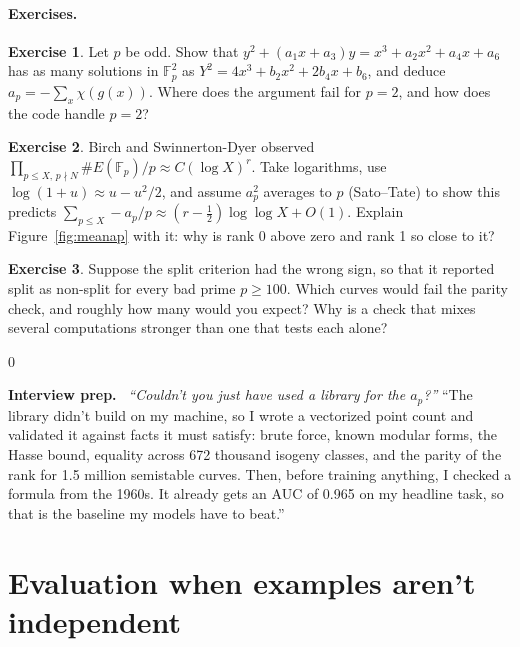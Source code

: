 \documentclass[11pt]{article}
\theoremstyle{definition}
\newtheorem{exercise}{Exercise}[section]
\theoremstyle{plain}
\theoremstyle{remark}
\newcommand{\F}{\mathbb{F}}
\renewcommand{\_}{\oldunderscore\allowbreak}
\newenvironment{interview}
  {\par\medskip\noindent\begin{lrbox}{0}\begin{minipage}{\dimexpr\linewidth-2\fboxsep-2\fboxrule\relax}
   \textbf{Interview prep.}\ }
  {\end{minipage}\end{lrbox}\fcolorbox{blue!40!black}{interviewbg}{\usebox{0}}\par\medskip}
\begin{document}
\paragraph{Exercises.}
\begin{exercise}\label{ex:count}
Let $p$ be odd. Show that $y^2+(a_1x+a_3)y=x^3+a_2x^2+a_4x+a_6$ has as many solutions in
$\F_p^2$ as $Y^2=4x^3+b_2x^2+2b_4x+b_6$, and deduce $a_p=-\sum_x\chi(g(x))$. Where does the
argument fail for $p=2$, and how does the code handle $p=2$?
\end{exercise}
\begin{exercise}\label{ex:bsd-sum}
Birch and Swinnerton-Dyer observed $\prod_{p\le X,\,p\nmid N}\#E(\F_p)/p\approx C(\log X)^r$. Take
logarithms, use $\log(1+u)\approx u-u^2/2$, and assume $a_p^2$ averages to $p$ (Sato--Tate)
to show this predicts $\sum_{p\le X}-a_p/p\approx(r-\tfrac12)\log\log X+O(1)$. Explain
Figure~\ref{fig:meanap} with it: why is rank 0 above zero and rank 1 so close to it?
\end{exercise}
\begin{exercise}\label{ex:parity-test}
Suppose the split criterion had the wrong sign, so that it reported split as non-split for
every bad prime $p\ge100$. Which curves would fail the parity check, and roughly how many
would you expect? Why is a check that mixes several computations stronger than one that
tests each alone?
\end{exercise}

\begin{interview}
\emph{``Couldn't you just have used a library for the $a_p$?''} ``The library didn't build on
my machine, so I wrote a vectorized point count and validated it against facts it must
satisfy: brute force, known modular forms, the Hasse bound, equality across 672 thousand
isogeny classes, and the parity of the rank for 1.5 million semistable curves. Then, before
training anything, I checked a formula from the 1960s. It already gets an AUC of 0.965 on my
headline task, so that is the baseline my models have to beat.''
\end{interview}

\section{Evaluation when examples aren't independent}
\label{sec:splits}
\end{document}
